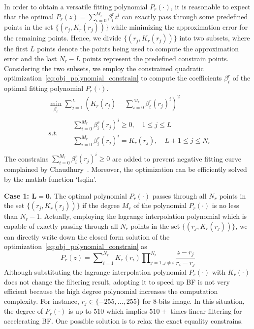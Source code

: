\documentclass[twocolumn]{el-author}
\begin{document}
In order to obtain a versatile fitting polynomial $P_r(\cdot)$, it is reasonable to expect that the optimal $P_r(z) = \sum_{i=0}^{M_r} \beta^r_i z^i $ can exactly pass through some predefined points in the set $\{(r_j, K_r(r_j))\}$ while minimizing the approximation error for the remaining points. Hence, we divide $\{(r_j, K_r(r_j))\}$ into two subsets, where the first $L$ points denote the points being used to compute the approximation error and the last $N_r-L$ points represent the predefined constrain points. Considering the two subsets, we employ the constrained quadratic optimization~\eqref{eq:obj_polynomial_constrain} to compute the  coefficients $\beta^r_i$ of the optimal fitting polynomial $P_r(\cdot)$.
%
\begin{equation}
\begin{split}
& \min_{\beta^r_i} \sum \nolimits_{j = 1}^{L} (K_{r}(r_j) - \sum \nolimits_{i=0}^{M_r} \beta^r_i (r_j)^i )^2 \\
& s.t. \quad
\begin{split}
& \sum \nolimits_{i=0}^{M_r} \beta^r_i (r_j)^i \ge 0, \quad 1 \leq  j \leq L \\
& \sum \nolimits_{i=0}^{M_r} \beta^r_i (r_j)^i = K_r(r_j), \quad L+1 \leq  j \leq N_r \\
\end{split}
\end{split}
\label{eq:obj_polynomial_constrain}
\end{equation}
%
The constrains $\sum \nolimits_{i=0}^{M_r} \beta^r_i (r_j)^i \ge 0$ are added to prevent negative fitting curve complained by Chaudhury~\cite{Chaudhury_TIP_2011}. Moreover, the optimization can be efficiently solved by the matlab function `lsqlin'.

\textbf{Case 1: $\bm{L =0}$.} The optimal polynomial  $P_r(\cdot)$ passes through all $N_r$ points in the set $\{(r_j, K_r(r_j))\}$ if the degree $M_r$ of the polynomial $P_r(\cdot)$ is no less than $N_r - 1$. Actually, employing the lagrange interpolation polynomial which is capable of exactly passing through all $N_r$ points in the set $\{(r_j, K_r(r_j))\}$, we can directly write down the closed form solution of the optimization~\eqref{eq:obj_polynomial_constrain} as
%
\begin{equation}
P_r(z) = \sum \nolimits^{N_r}_{i=1} K_r(r_i) \prod \nolimits_{j=1, j \neq i}^{N_r} \frac{z - r_j}{r_i - r_j}
\label{eq:Pr_lagrange}
\end{equation}
%
Although substituting the lagrange interpolation polynomial $P_r(\cdot)$ with $K_r(\cdot)$ does not change the filtering result, adopting it to speed up BF is not very efficient because the high degree polynomial increases the computation complexity. For instance, $r_j \in \{-255, \ldots,255\}$ for 8-bits image. In this situation, the degree of $P_r(\cdot)$ is up to $510$ which implies $510+$ times linear filtering for accelerating BF. One possible solution is to relax the exact equality constrains. %
\end{document}
